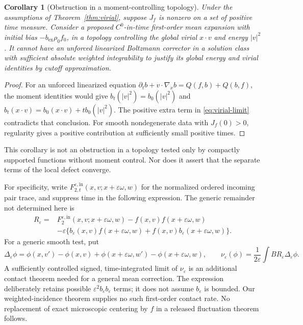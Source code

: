 \documentclass[11pt,letterpaper]{article}
\numberwithin{equation}{section}
\newtheorem{corollary}[theorem]{Corollary}
\theoremstyle{definition}\newtheorem{assumption}[theorem]{Assumption}
\theoremstyle{remark}\newtheorem{remark}[theorem]{Remark}
\newcommand{\eps}{\varepsilon}\newcommand{\dd}{\,\mathrm d}
\newcommand{\bex}{b_{\mathrm{ex}}}\newcommand{\Pcoll}{\Pi_{\mathrm{coll}}}
\begin{document}
\begin{corollary}[Obstruction in a moment-controlling topology]\label{cor:obstruction}
Under the assumptions of Theorem~\ref{thm:virial}, suppose $J_f$ is nonzero on a set of positive time measure. Consider a proposed $C^0$-in-time first-order mean expansion with initial bias $-\bex\rho_0f_0$, in a topology controlling the global virial $x\cdot v$ and energy $|v|^2$. It cannot have an unforced linearized Boltzmann corrector in a solution class with sufficient absolute weighted integrability to justify its global energy and virial identities by cutoff approximation.
\end{corollary}
\begin{proof}
For an unforced linearized equation
$\partial_tb+v\cdot\nabla_xb=Q(f,b)+Q(b,f)$,
the moment identities would give $b_t(|v|^2)=b_0(|v|^2)$ and
$b_t(x\cdot v)=b_0(x\cdot v)+tb_0(|v|^2)$.
The positive extra term in \eqref{eq:virial-limit} contradicts that conclusion. For smooth nondegenerate data with $J_f(0)>0$, regularity gives a positive contribution at sufficiently small positive times.
\end{proof}
This corollary is not an obstruction in a topology tested only by compactly supported functions without moment control. Nor does it assert that the separate terms of the local defect converge.

For specificity, write $F_{2,t}^{\eps,\mathrm{in}}(x,v;x+\eps\omega,w)$ for the normalized ordered incoming pair trace, and suppress time in the following expression. The generic remainder not determined here is
\begin{align*}
 R_\eps={}&F_2^{\eps,\mathrm{in}}(x,v;x+\eps\omega,w)
                 -f(x,v)f(x+\eps\omega,w)\\
 &-\eps\{b_\eps(x,v)f(x+\eps\omega,w)
                      +f(x,v)b_\eps(x+\eps\omega,w)\}.
\end{align*}
For a generic smooth test, put
\[
 \Delta_\eps\phi=\phi(x,v')-\phi(x,v)
       +\phi(x+\eps\omega,w')-\phi(x+\eps\omega,w),\qquad
 \nu_\eps(\phi)=\frac1{2\eps}\int BR_\eps\Delta_\eps\phi.
\]
A sufficiently controlled signed, time-integrated limit of $\nu_\eps$ is an additional contact theorem needed for a general mean correction. The expression deliberately retains possible $\eps^2b_\eps b_\eps$ terms; it does not assume $b_\eps$ is bounded. Our weighted-incidence theorem supplies no such first-order contact rate. No replacement of exact microscopic centering by $f$ in a released fluctuation theorem follows.
\end{document}
